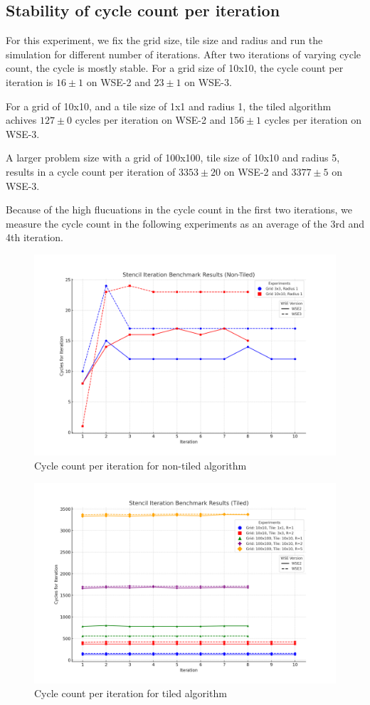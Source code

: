 \documentclass{article}
\begin{document}
\subsection{Stability of cycle count per iteration}
For this experiment, we fix the grid size, tile size and radius and run the simulation for different number of iterations.
After two iterations of varying cycle count, the cycle is mostly stable.
For a grid size of 10x10, the cycle count per iteration is $16\pm1$ on WSE-2 and $23\pm1$ on WSE-3.

For a grid of 10x10, and a tile size of 1x1 and radius 1, the tiled algorithm achives $127\pm0$ cycles per iteration on WSE-2 and $156\pm1$ cycles per iteration on WSE-3.

A larger problem size with a grid of 100x100, tile size of 10x10 and radius 5, results in a cycle count per iteration of $3353\pm20$ on WSE-2 and $3377\pm5$ on WSE-3.

Because of the high flucuations in the cycle count in the first two iterations, we measure the cycle count in the following experiments as an average of the 3rd and 4th iteration.

\begin{figure}
    \centering
    \includegraphics[width=0.5\linewidth]{plots/non_tiled_iteration_stability.png}
    \caption{Cycle count per iteration for non-tiled algorithm}
    \label{fig:non_tiled_iteration_stability}
\end{figure}

\begin{figure}
    \centering
    \includegraphics[width=0.5\linewidth]{plots/tiled_iteration_stability.png}
    \caption{Cycle count per iteration for tiled algorithm}
    \label{fig:tiled_iteration_stability}
\end{figure}
\end{document}
